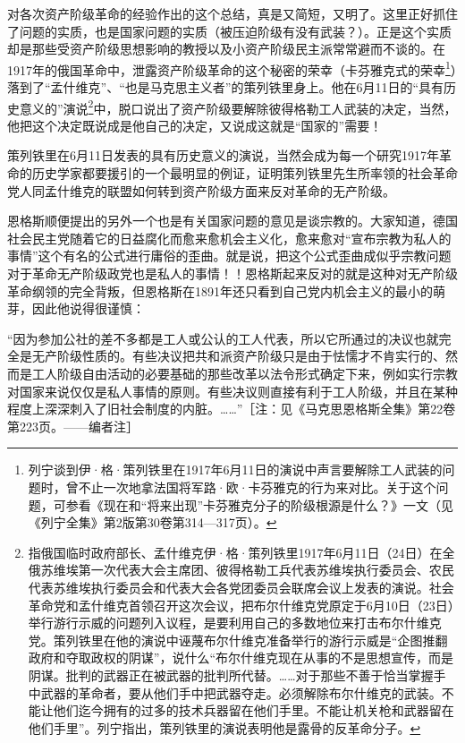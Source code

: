 \documentclass[UTF8, 12pt, a4paper]{ctexrep}
\begin{document}
对各次资产阶级革命的经验作出的这个总结，真是又简短，又明了。这里正好抓住了问题的实质，也是国家问题的实质（被压迫阶级有没有武装？）。正是这个实质却是那些受资产阶级思想影响的教授以及小资产阶级民主派常常避而不谈的。在1917年的俄国革命中，泄露资产阶级革命的这个秘密的荣幸（卡芬雅克式的荣幸\footnote{列宁谈到伊·格·策列铁里在1917年6月11日的演说中声言要解除工人武装的问题时，曾不止一次地拿法国将军路·欧·卡芬雅克的行为来对比。关于这个问题，可参看《现在和“将来出现”卡芬雅克分子的阶级根源是什么？》一文（见《列宁全集》第2版第30卷第314—317页）。}）落到了“孟什维克”、“也是马克思主义者”的策列铁里身上。他在6月11日的“具有历史意义的”演说\footnote{指俄国临时政府部长、孟什维克伊·格·策列铁里1917年6月11日（24日）在全俄苏维埃第一次代表大会主席团、彼得格勒工兵代表苏维埃执行委员会、农民代表苏维埃执行委员会和代表大会各党团委员会联席会议上发表的演说。社会革命党和孟什维克首领召开这次会议，把布尔什维克党原定于6月10日（23日）举行游行示威的问题列入议程，是要利用自己的多数地位来打击布尔什维克党。策列铁里在他的演说中诬蔑布尔什维克准备举行的游行示威是“企图推翻政府和夺取政权的阴谋”，说什么“布尔什维克现在从事的不是思想宣传，而是阴谋。批判的武器正在被武器的批判所代替。……对于那些不善于恰当掌握手中武器的革命者，要从他们手中把武器夺走。必须解除布尔什维克的武装。不能让他们迄今拥有的过多的技术兵器留在他们手里。不能让机关枪和武器留在他们手里”。列宁指出，策列铁里的演说表明他是露骨的反革命分子。}中，脱口说出了资产阶级要解除彼得格勒工人武装的决定，当然，他把这个决定既说成是他自己的决定，又说成这就是“国家的”需要！

策列铁里在6月11日发表的具有历史意义的演说，当然会成为每一个研究1917年革命的历史学家都要援引的一个最明显的例证，证明策列铁里先生所率领的社会革命党人同孟什维克的联盟如何转到资产阶级方面来反对革命的无产阶级。

恩格斯顺便提出的另外一个也是有关国家问题的意见是谈宗教的。大家知道，德国社会民主党随着它的日益腐化而愈来愈机会主义化，愈来愈对“宣布宗教为私人的事情”这个有名的公式进行庸俗的歪曲。就是说，把这个公式歪曲成似乎宗教问题对于革命无产阶级政党也是私人的事情！！恩格斯起来反对的就是这种对无产阶级革命纲领的完全背叛，但恩格斯在1891年还只看到自己党内机会主义的最小的萌芽，因此他说得很谨慎：

“因为参加公社的差不多都是工人或公认的工人代表，所以它所通过的决议也就完全是无产阶级性质的。有些决议把共和派资产阶级只是由于怯懦才不肯实行的、然而是工人阶级自由活动的必要基础的那些改革以法令形式确定下来，例如实行宗教对国家来说仅仅是私人事情的原则。有些决议则直接有利于工人阶级，并且在某种程度上深深刺入了旧社会制度的内脏。……”［注：见《马克思恩格斯全集》第22卷第223页。——编者注］
\end{document}
